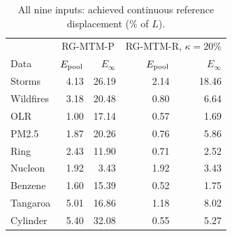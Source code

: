 \begin{table}[t]
\caption{All nine inputs: achieved continuous reference displacement (\% of $L$).}\label{tab:achieved_main}
\centering\footnotesize\begin{tabular}{lrrrr}\toprule
 & \multicolumn{2}{c}{RG-MTM-P} & \multicolumn{2}{c}{RG-MTM-R, $\kappa=20\%$}\\
Data & $E_{\rm pool}$ & $E_\infty$ & $E_{\rm pool}$ & $E_\infty$\\\midrule
Storms & 4.13 & 26.19 & 2.14 & 18.46\\
Wildfires & 3.18 & 20.48 & 0.80 & 6.64\\
OLR & 1.00 & 17.14 & 0.57 & 1.69\\
PM2.5 & 1.87 & 20.26 & 0.76 & 5.86\\
Ring & 2.43 & 11.90 & 0.71 & 2.52\\
Nucleon & 1.92 & 3.43 & 1.92 & 3.43\\
Benzene & 1.60 & 15.39 & 0.52 & 1.75\\
Tangaroa & 5.01 & 16.86 & 1.18 & 8.02\\
Cylinder & 5.40 & 32.08 & 0.55 & 5.27\\
\bottomrule\end{tabular}
\par{}
\end{table}
